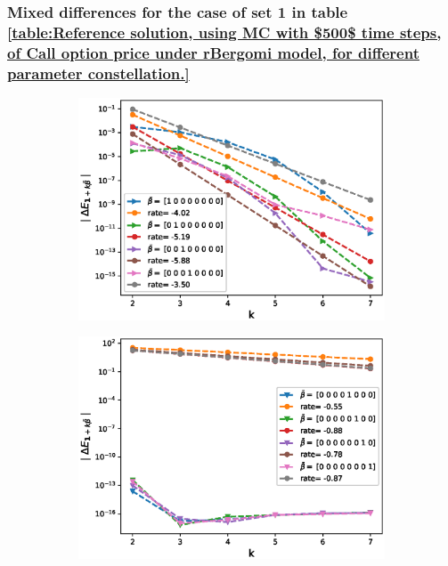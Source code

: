 \documentclass[11pt]{article}
\begin{document}
\subsubsection{Mixed differences for the case of set 1 in table \ref{table:Reference solution, using MC with $500$ time steps, of Call option price under rBergomi model, for different parameter constellation.}}\label{Mixed differences for the case of set 1}
\begin{figure}[h!]
	\centering
	\begin{subfigure}{.4\textwidth}
		\centering
		\includegraphics[width=1\linewidth]{./figures/rBergomi_mixed_error_rates/without_change_measure/N_4/H_043/first_difference_rbergomi_4steps_H_043_K_1_totally_hierarch_with_rate_W1}
		\caption{}
		\label{fig:sub3}
	\end{subfigure}%
	\begin{subfigure}{.4\textwidth}
		\centering
		\includegraphics[width=1\linewidth]{./figures/rBergomi_mixed_error_rates/without_change_measure/N_4/H_043/first_difference_rbergomi_4steps_H_043_K_1_totally_hierarch_with_rate_W2}
		\caption{}
		\label{fig:sub4}
	\end{subfigure}
	

\end{figure}
\end{document}
